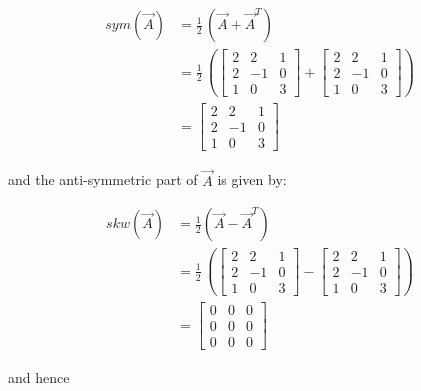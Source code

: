 \documentclass[12pt,bibstyle=none,pagenumberinfooter]{ifmdocument}
\begin{document}
\begin{align}
    sym(\Vec{A}) 
    &   =\frac{1}{2}\,(\vec{A} + \vec{A}^{T}) \\
    &   = \frac{1}{2}\, \left(  \begin{bmatrix}
                             2 & 2 & 1 \\ 2 & -1 & 0 \\ 1 & 0 & 3
                            \end{bmatrix} +  \begin{bmatrix}
                            2 & 2 & 1 \\ 2 & -1 & 0 \\ 1 & 0 & 3 
                            \end{bmatrix}
                            \right) \\
    &   = \begin{bmatrix}
        2 & 2 & 1 \\ 2 & -1 & 0 \\ 1 & 0 & 3
        \end{bmatrix}        
\end{align}

and the anti-symmetric part of $\vec{A}$ is given by:

\begin{align}
    skw(\Vec{A}) 
    &   = \frac{1}{2}\left(\Vec{A} - \Vec{A}^T \right) \\
    &   = \frac{1}{2}\, \left(  \begin{bmatrix}
                             2 & 2 & 1 \\ 2 & -1 & 0 \\ 1 & 0 & 3
                            \end{bmatrix} -  \begin{bmatrix}
                            2 & 2 & 1 \\ 2 & -1 & 0 \\ 1 & 0 & 3 
                            \end{bmatrix}
                            \right) \\
  &   = \begin{bmatrix}
        0 & 0 & 0 \\ 0 & 0 & 0 \\ 0 & 0 & 0
        \end{bmatrix}                             
\end{align}



and hence
\end{document}

